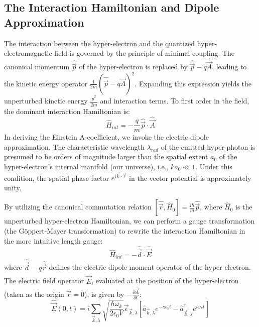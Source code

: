 \subsection{The Interaction Hamiltonian and Dipole Approximation}
The interaction between the hyper-electron and the quantized hyper-electromagnetic field is governed by the principle of minimal coupling. The canonical momentum $\hat{\vec{p}}$ of the hyper-electron is replaced by $\hat{\vec{p}} - q\hat{\vec{A}}$, leading to the kinetic energy operator $\frac{1}{2m}(\hat{\vec{p}} - q\hat{\vec{A}})^2$. Expanding this expression yields the unperturbed kinetic energy $\frac{\hat{p}^2}{2m}$ and interaction terms. To first order in the field, the dominant interaction Hamiltonian is:
\begin{equation}
    \hat{H}_{int} = -\frac{q}{m} \hat{\vec{p}} \cdot \hat{\vec{A}}
\end{equation}
In deriving the Einstein A-coefficient, we invoke the electric dipole approximation. The characteristic wavelength $\lambda_{rad}$ of the emitted hyper-photon is presumed to be orders of magnitude larger than the spatial extent $a_0$ of the hyper-electron's internal manifold (our universe), i.e., $ka_0 \ll 1$. Under this condition, the spatial phase factor $e^{i\vec{k} \cdot \vec{r}}$ in the vector potential is approximately unity.

By utilizing the canonical commutation relation $[\hat{\vec{r}}, \hat{H}_0] = \frac{i\hbar}{m} \hat{\vec{p}}$, where $\hat{H}_0$ is the unperturbed hyper-electron Hamiltonian, we can perform a gauge transformation (the G\"oppert-Mayer transformation) to rewrite the interaction Hamiltonian in the more intuitive length gauge:
\begin{equation}
    \hat{H}_{int} = - \hat{\vec{d}} \cdot \hat{\vec{E}}
\end{equation}
where $\hat{\vec{d}} = q \hat{\vec{r}}$ defines the electric dipole moment operator of the hyper-electron. The electric field operator $\hat{\vec{E}}$, evaluated at the position of the hyper-electron (taken as the origin $\vec{r}=0$), is given by $-\frac{\partial \hat{\vec{A}}}{\partial t}$:
\begin{equation}
    \hat{\vec{E}}(0, t) = i \sum_{\vec{k}, \lambda} \sqrt{\frac{\hbar \omega_k}{2 \epsilon_0 V}} \vec{\epsilon}_{\vec{k}, \lambda} \left[ \hat{a}_{\vec{k}, \lambda} e^{-i\omega_k t} - \hat{a}_{\vec{k}, \lambda}^\dagger e^{i\omega_k t} \right]
\end{equation}

